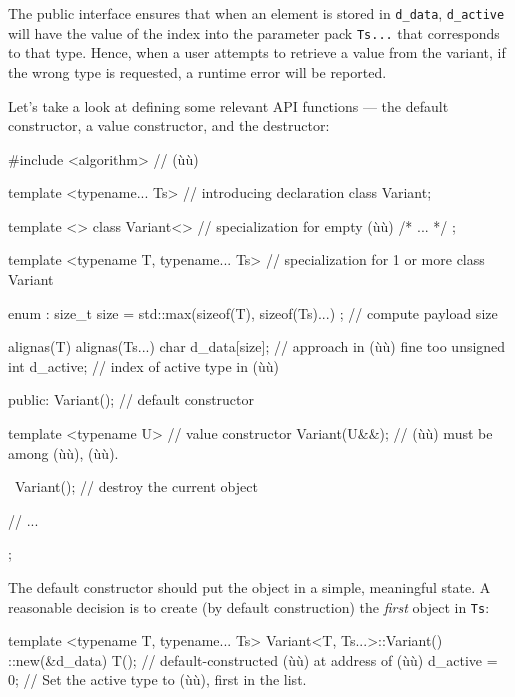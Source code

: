 The public interface ensures that when an element is stored in
\lstinline!d_data!, \lstinline!d_active! will have the value of the index
into the parameter pack \lstinline!Ts...! that corresponds to that type.
Hence, when a user attempts to retrieve a value from the variant, if the
wrong type is requested, a runtime error will be reported.

Let's take a look at defining some relevant API functions --- the
default constructor, a value constructor, and the destructor:

\begin{emcppslisting}
#include <algorithm>                   // (ù{}ù)

template <typename... Ts>              // introducing declaration
class Variant;

template <> class Variant<>            // specialization for empty (ù{}ù)
{ /* ... */ };

template <typename T, typename... Ts>  // specialization for 1 or more
class Variant
{
    enum : size_t { size = std::max({sizeof(T), sizeof(Ts)...}) };
        // compute payload size

    alignas(T) alignas(Ts...)
    char d_data[size];                 // approach in (ù{}ù) fine too
    unsigned int d_active;             // index of active type in (ù{}ù)

public:
    Variant();                         // default constructor

    template <typename U>              // value constructor
    Variant(U&&);                      // (ù{}ù) must be among (ù{}ù), (ù{}ù).

    ~Variant();                        // destroy the current object

    // ...
};
\end{emcppslisting}
    

\noindent The default constructor should put the object in a simple, meaningful
state. A reasonable decision is to create (by default construction) the
\emph{first} object in \lstinline!Ts!:

\begin{emcppslisting}
template <typename T, typename... Ts>
Variant<T, Ts...>::Variant()
{
    ::new(&d_data) T();  // default-constructed (ù{}ù) at address of (ù{}ù)
    d_active = 0;        // Set the active type to (ù{}ù), first in the list.
}
\end{emcppslisting}
    

